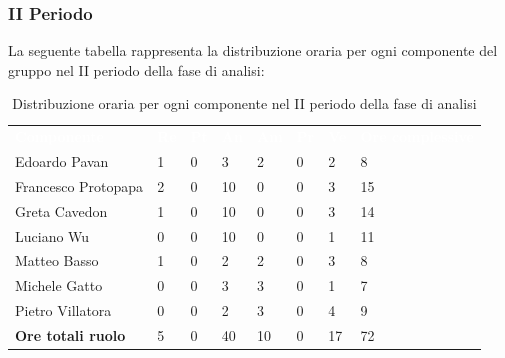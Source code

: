 \subsubsection{II Periodo}
La seguente tabella rappresenta la distribuzione oraria per ogni componente del gruppo nel II periodo della fase di analisi:
\begin{table}[H]
\begin{center}
\renewcommand{\arraystretch}{1.25}
\begin{tabular}{ m{}<{\centering}  m{}<{\centering} m{}<{\centering} m{}<{\centering}  m{}<{\centering}  m{}<{\centering}  m{}<{\centering}  m{}<{\centering}   }
	\rowcolor{darkblue}
	\textcolor{white}{\textbf{Componente}} &\textcolor{white}{\textbf{Re}}&\textcolor{white}{\textbf{Pt}}&\textcolor{white}{\textbf{An}}&\textcolor{white}{\textbf{Am}}&\textcolor{white}{\textbf{Pr}}&\textcolor{white}{\textbf{Ve}}&\textcolor{white}{\textbf{Ore complessive}}\\ 
	Edoardo Pavan & 1 & 0 & 3 & 2 & 0 & 2 & 8 \\	
	
	Francesco Protopapa & 2 & 0 & 10 & 0 & 0 & 3 & 15 \\

	Greta Cavedon & 1 & 0 & 10 & 0 & 0 & 3 & 14 \\
	
	Luciano Wu & 0 & 0 & 10 & 0 & 0 & 1 & 11 \\
	
	Matteo Basso & 1 & 0 & 2 & 2 & 0 & 3 & 8 \\
	
	Michele Gatto &  0 & 0 & 3 & 3 & 0 & 1 & 7 \\
	
	Pietro Villatora & 0 & 0 & 2 & 3 & 0 & 4 & 9 \\
	
	\textbf{Ore totali ruolo} & 5 & 0 & 40 & 10 & 0 & 17 & 72\\

\end{tabular}
\caption{Distribuzione oraria per ogni componente nel II periodo della fase di analisi}
\end{center}
\end{table}


